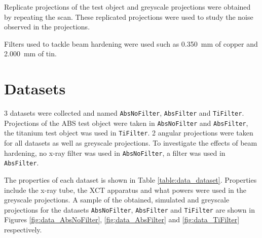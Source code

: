 Replicate projections of the test object and greyscale projections were obtained by repeating the scan. These replicated projections were used to study the noise observed in the projections.

Filters used to tackle beam hardening were used such as \SI{0.350}{\milli\metre} of copper and \SI{2.000}{\milli\metre} of tin.

\section{Datasets}

3 datasets were collected and named \texttt{AbsNoFilter}, \texttt{AbsFilter} and \texttt{TiFilter}. Projections of the ABS test object were taken in \texttt{AbsNoFilter} and \texttt{AbsFilter}, the titanium test object was used in \texttt{TiFilter}. 2 angular projections were taken for all datasets as well as greyscale projections. To investigate the effects of beam hardening, no x-ray filter was used in \texttt{AbsNoFilter}, a filter was used in \texttt{AbsFilter}.

The properties of each dataset is shown in Table \ref{table:data_dataset}. Properties include the x-ray tube, the XCT apparatus and what powers were used in the greyscale projections. A sample of the obtained, simulated and greyscale projections for the datasets \texttt{AbsNoFilter}, \texttt{AbsFilter} and \texttt{TiFilter} are shown in Figures \ref{fig:data_AbsNoFilter}, \ref{fig:data_AbsFilter} and \ref{fig:data_TiFilter} respectively.

